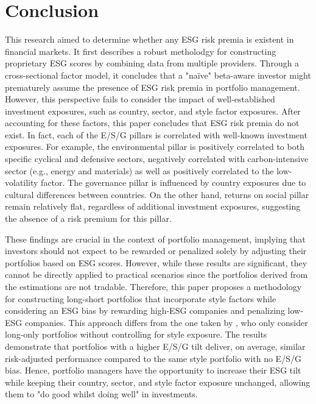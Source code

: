 \documentclass[11pt,a4paper]{article}
\begin{document}
\clearpage

\section{Conclusion}\label{sec:conclusion}

This research aimed to determine whether any ESG risk premia is existent in financial markets.
It first describes a robust metholodgy for constructing proprietary ESG scores by combining data from multiple providers.
Through a cross-sectional factor model, it concludes that a "naïve" beta-aware investor might prematurely assume the presence of ESG risk premia in portfolio management. 
However, this perspective fails to consider the impact of well-established investment exposures, such as country, sector, and style factor exposures. 
After accounting for these factors, this paper concludes that ESG risk premia do not exist. 
In fact, each of the E/S/G pillars is correlated with well-known investment exposures. 
For example, the environmental pillar is positively correlated to both specific cyclical and defensive sectors, negatively correlated with carbon-intensive sector (e.g., energy and materials) as well as positively correlated to the low-volatility factor. 
The governance pillar is influenced by country exposures due to cultural differences between countries. 
On the other hand, returns on social pillar remain relatively flat, regardless of additional investment exposures, suggesting the absence of a risk premium for this pillar.

These findings are crucial in the context of portfolio management, implying that investors should not expect to be rewarded or penalized solely by adjusting their portfolios based on ESG scores. 
However, while these results are significant, they cannot be directly applied to practical scenarios since the portfolios derived from the estimations are not tradable. 
Therefore, this paper proposes a methodology for constructing long-short portfolios that incorporate style factors while considering an ESG bias by rewarding high-ESG companies and penalizing low-ESG companies. 
This approach differs from the one taken by , who only consider long-only portfolios without controlling for style exposure.
The results demonstrate that portfolios with a higher E/S/G tilt deliver, on average, similar risk-adjusted performance compared to the same style portfolio with no E/S/G bias. 
Hence, portfolio managers have the opportunity to increase their ESG tilt while keeping their country, sector, and style factor exposure unchanged, allowing them to "do good whilst doing well" in investments. 
\end{document}
